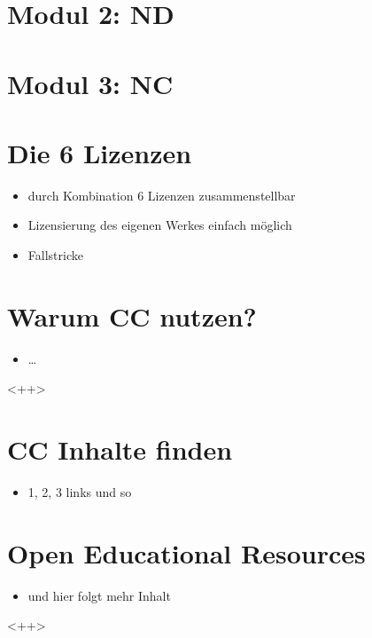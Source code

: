 \documentclass[14pt,handout]{beamer}
\begin{document}
\section{Modul 2: ND}
\section{Modul 3: NC}
\section{Die 6 Lizenzen}
\begin{itemize}
    \item<2-> durch Kombination 6 Lizenzen zusammenstellbar
    \item<3-> Lizensierung des eigenen Werkes einfach möglich
    \item<4-> Fallstricke
\end{itemize}
\section{Warum CC nutzen?}
\begin{itemize}
    \item<2-> \ldots
\end{itemize}<++>
\section{CC Inhalte finden}
\begin{itemize}
    \item<2-> 1, 2, 3 links und so
\end{itemize}
\section{Open Educational Resources}
\begin{itemize}
    \item<2-> und hier folgt mehr Inhalt
\end{itemize}<++>
\end{document}
